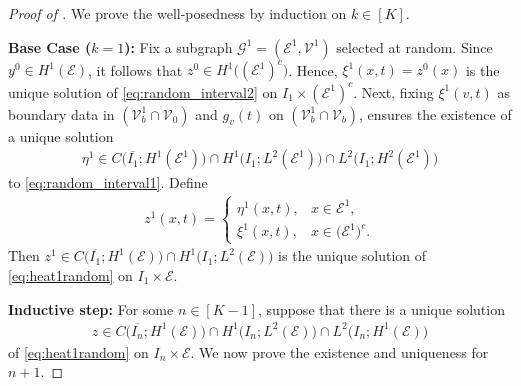 \documentclass[a4paper, 10pt, english]{article}
\begin{document}
\begin{proof}[Proof of ]
We prove the well-posedness by induction on $k \in [K]$.

\smallbreak

\noindent
\textbf{Base Case ($k = 1$):} Fix a subgraph $\mathcal{G}^1 = (\mathcal{E}^1, \mathcal{V}^1)$ selected at random. Since $y^0 \in H^1(\mathcal{E})$, it follows that $z^0 \in H^1\bigl((\mathcal{E}^1)^c\bigr)$. Hence, $\xi^1(x,t) = z^0(x)$ is the unique solution of \eqref{eq:random_interval2} on $I_1 \times (\mathcal{E}^1)^c$. Next, fixing  $\xi^1(v,t)$ as boundary data in $(\mathcal{V}_b^1 \cap \mathcal{V}_0)$ and $g_v(t)$ on $(\mathcal{V}_b^1 \cap \mathcal{V}_b)$,  ensures the existence of a unique solution
\begin{align*}
  \eta^1 \in C\bigl(\overline{I_1}; H^1(\mathcal{E}^1)\bigr) 
  \cap
  H^1\bigl(I_1; L^2(\mathcal{E}^1)\bigr)
  \cap
  L^2\bigl(I_1; H^2(\mathcal{E}^1)\bigr)
\end{align*}
to \eqref{eq:random_interval1}. Define
\begin{align*}
  z^1(x,t)
  =
  \begin{cases}
    \eta^1(x,t), & x \in \mathcal{E}^1, \\
    \xi^1(x,t),    & x \in \bigl(\mathcal{E}^1\bigr)^c.
  \end{cases}
\end{align*}
Then $z^1\in 
  C\bigl(\overline{I_1}; H^1(\mathcal{E})\bigr)
  \cap
  H^1\bigl(I_1; L^2(\mathcal{E})\bigr)$ is the unique solution of \eqref{eq:heat1random} on $I_1 \times \mathcal{E}$.

\smallbreak

\noindent
\textbf{Inductive step:} 
For some $n\in [K-1]$, suppose that there is a unique solution
\begin{align*}
  z \in 
  C\bigl(\overline{I_n}; H^1(\mathcal{E})\bigr)
  \cap
  H^1\bigl(I_n; L^2(\mathcal{E})\bigr)
  \cap
  L^2\bigl(I_n; H^1(\mathcal{E})\bigr)
\end{align*}
of \eqref{eq:heat1random} on $I_n \times \mathcal{E}$. We now prove the existence and uniqueness for $n+1$.


\end{proof}
\end{document}
